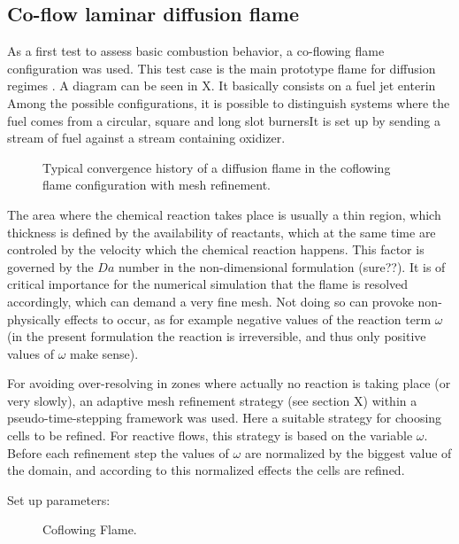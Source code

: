 
\subsection{Co-flow laminar diffusion flame}\label{ssec:coflowFlame}
As a first test to assess basic combustion behavior, a co-flowing flame configuration was used. This test case is the main prototype flame for diffusion regimes \cite{poinsotTheoreticalNumericalCombustion2005}.  A diagram can be seen in X. It basically consists on a fuel jet enterin Among the possible configurations, it is possible to distinguish systems where the fuel comes from a circular, square and long slot burnersIt is set up by sending a stream of fuel against a stream containing oxidizer.
\begin{figure}[t!]
	\centering
	\caption{Typical convergence history of a diffusion flame in the coflowing flame configuration with mesh refinement.}
	\label{fig:CoFlow_ConvergenceStory}
\end{figure}

The area where the chemical reaction takes place is usually a thin region, which thickness is defined by the availability of reactants, which at the same time are controled by the velocity which the chemical reaction happens. This factor is governed by the $Da$ number in the non-dimensional formulation (sure??). It is of critical importance for the numerical simulation that the flame is resolved accordingly, which can demand a very fine mesh. Not doing so can provoke non-physically effects to occur, as for example negative values of the reaction term $\omega$ (in the present formulation the reaction is irreversible, and thus only positive values of $\omega$ make sense).

For avoiding over-resolving in zones where actually no reaction is taking place (or very slowly), an adaptive mesh refinement strategy  (see section X) within a pseudo-time-stepping framework was used.  Here a suitable strategy for choosing cells to be refined. For reactive flows, this strategy is based on the variable $\omega$.
Before each refinement step the values of $\omega$ are normalized by the biggest value of the domain, and according to this normalized effects the cells are refined. %

Set up parameters: 
\begin{figure}
	\centering
	\pgfplotsset{width=0.75 \textwidth, compat=1.3}
	\caption{Coflowing Flame.} \label{fig:CoFlowFlameFig}
\end{figure}

